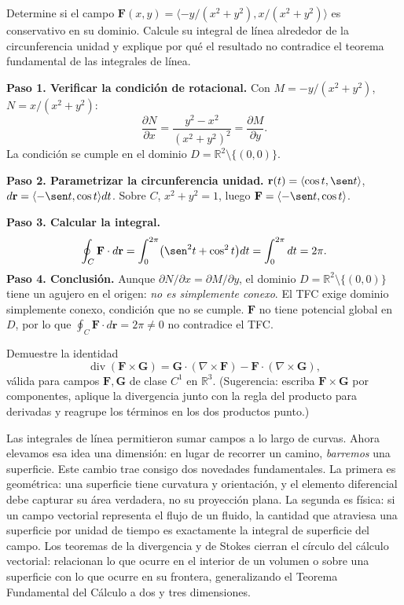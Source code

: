\begin{prob}
Determine si el campo $\mathbf{F}(x,y) = \langle -y/(x^2+y^2),
x/(x^2+y^2) \rangle$ es conservativo en su dominio. Calcule su integral
de línea alrededor de la circunferencia unidad y explique por qué el
resultado no contradice el teorema fundamental de las integrales de
línea.
\begin{myproof}
\textbf{Paso 1. Verificar la condición de rotacional.} Con $M=-y/(x^2+y^2)$, $N=x/(x^2+y^2)$:
\[
\frac{\partial N}{\partial x}=\frac{y^2-x^2}{(x^2+y^2)^2}=\frac{\partial M}{\partial y}.
\]
La condición se cumple en el dominio $D=\mathbb{R}^2\setminus\{(0,0)\}$.

\textbf{Paso 2. Parametrizar la circunferencia unidad.} $\mathbf{r}(t)=\langle\cos t,\sen t\rangle$, $d\mathbf{r}=\langle-\sen t,\cos t\rangle dt$. Sobre $C$, $x^2+y^2=1$, luego $\mathbf{F}=\langle-\sen t,\cos t\rangle$.

\textbf{Paso 3. Calcular la integral.}
\[
\oint_C\mathbf{F}\cdot d\mathbf{r}=\int_0^{2\pi}\bigl(\sen^2 t+\cos^2 t\bigr)dt=\int_0^{2\pi}dt=2\pi.
\]
\textbf{Paso 4. Conclusión.} Aunque $\partial N/\partial x=\partial M/\partial y$, el dominio $D=\mathbb{R}^2\setminus\{(0,0)\}$ tiene un agujero en el origen: \emph{no es simplemente conexo}. El TFC exige dominio simplemente conexo, condición que no se cumple. $\mathbf{F}$ no tiene potencial global en $D$, por lo que $\oint_C\mathbf{F}\cdot d\mathbf{r}=2\pi\ne0$ no contradice el TFC.
\end{myproof}
\end{prob}

\begin{prob}
Demuestre la identidad
\[
\operatorname{div}(\mathbf F\times\mathbf G)
=\mathbf G\cdot(\nabla\times\mathbf F)-\mathbf F\cdot(\nabla\times\mathbf G),
\]
válida para campos $\mathbf F,\mathbf G$ de clase $C^1$ en $\mathbb R^3$.
(Sugerencia: escriba $\mathbf F\times\mathbf G$ por componentes, aplique la
divergencia junto con la regla del producto para derivadas y reagrupe los
términos en los dos productos punto.)
\end{prob}

Las integrales de línea permitieron sumar campos a lo largo de curvas. Ahora elevamos esa idea una dimensión: en lugar de recorrer un camino, \emph{barremos} una superficie. Este cambio trae consigo dos novedades fundamentales. La primera es geométrica: una superficie tiene curvatura y orientación, y el elemento diferencial debe capturar su área verdadera, no su proyección plana. La segunda es física: si un campo vectorial representa el flujo de un fluido, la cantidad que atraviesa una superficie por unidad de tiempo es exactamente la integral de superficie del campo. Los teoremas de la divergencia y de Stokes cierran el círculo del cálculo vectorial: relacionan lo que ocurre en el interior de un volumen o sobre una superficie con lo que ocurre en su frontera, generalizando el Teorema Fundamental del Cálculo a dos y tres dimensiones.

